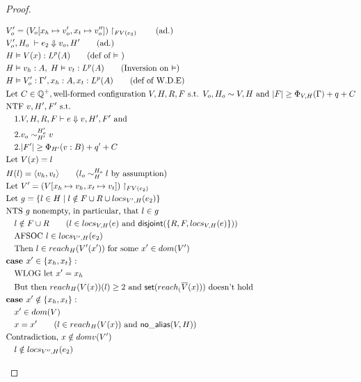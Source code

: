 \documentclass[11pt]{article}
\newcommand{\ms}[1]{\ensuremath{\mathsf{#1}}}
\newcommand{\na}[1]{\mathsf{no\_alias}(#1)}
\newcommand{\dist}[1]{\mathsf{disjoint}(#1)}
\newcommand{\veq}[4]{#3 \sim^{#1}_{#2} #4}
\theoremstyle{definition}
\begin{document}
\begin{proof}
\begin{description}
\begin{align*}
	&V_o' = (V_o[x_h \mapsto v_o', x_t \mapsto v_o''])\restriction_{FV(e_2)}\tag{ad.}\\
  &V_o',H_o \; \vdash e_2 \Downarrow v_o, H' \tag{ad.}\\
  &H \vDash V(x) : L^p(A) \tag{def of $\vDash$ }\\
  &H\vDash v_h : A,\; H \vDash v_t : L^p(A) \tag{Inversion on $\vDash$}\\
  &H \vDash V_o' : \Gamma', x_h : A, x_t : L^p(A) \tag{def of W.D.E}\\
&\text{Let } C \in \mathbb{Q}^+, \text{well-formed configuration } V,H,R,F \text{ s.t. }
		V_o,H_o \sim V,H
			\text{ and }|F| \ge \Phi_{V,H}(\Gamma) + q + C\\
  &\text{NTF } v,H',F' \text{ s.t. }\\
  &\quad 1. V,H,R,F \vdash e \Downarrow v, H',F' \text{ and }\\ 
	&\quad 2. \veq{H_o'}{H'}{v_o}{v}\\
  &\quad 2. |F'| \ge \Phi_{H'}(v:B) + q' + C\\
	&\text{Let } V(x) =  l\\
		&H(l) = \pairexcst{v_h}{v_t} \tag{$\veq{H_o}{H}{l_o}{l}$ by assumption}\\
	&\text{Let } V' = (V[x_h \mapsto v_h, x_t \mapsto v_t])\restriction_{FV(e_2)}\\
	&\text{Let } g = \{l \in H \mid l \notin F \cup R \cup locs_{V',H}(e_2)\}\\
  &\text{NTS $g$ nonempty, in particular, that } l \in g\\
	&\quad l \notin F \cup R \tag{$l \in locs_{V,H}(e)$ and $\dist{\{R,F,locs_{V,H}(e)\}}$}\\
  &\quad \text{AFSOC } l \in locs_{V',H}(e_2)\\
		&\quad \text{Then } l \in reach_H(V'(x')) \text{ for some } x' \in dom(V')\\
		&\textbf{case }x' \in \{x_h,x_t\}:\\
  &\quad \text{WLOG let } x' = x_h\\
		&\quad \text{But then } reach_H(V(x))(l) \ge 2 \text{ and } \ms{set}(reach_(\overline V(x))) \text{ doesn't hold}\\
		&\textbf{case } x' \notin \{x_h,x_t\}:\\
		&\quad x' \in dom(V)\\
		&\quad x = x' \tag{$l \in reach_H(V(x))$ and $\na{V,H}$}\\
		&\text{Contradiction, } x \notin domv(V')\\
  &\quad l \notin locs_{V'',H}(e_2)\\

\end{align*}
\end{description}
\end{proof}
\end{document}
